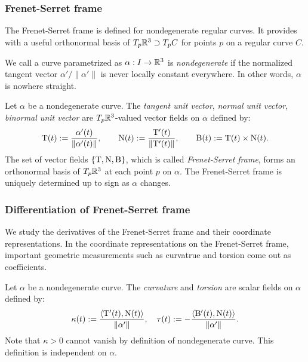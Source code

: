 \documentclass{../exp}
\def\a{\alpha}
\begin{document}
\subsubsection{Frenet-Serret frame}
The Frenet-Serret frame is defined for nondegenerate regular curves.
It provides with a useful orthonormal basis of $T_p\mathbb{R}^3\supset T_pC$ for points $p$ on a regular curve $C$.
\begin{defn}
We call a curve parametrized as $\a:I\to\R^3$ is \emph{nondegenerate} if the normalized tangent vector $\a'/\|\a'\|$ is never locally constant everywhere.
In other words, $\a$ is nowhere straight.
\end{defn}

\begin{defn}
Let $\a$ be a nondegenerate curve.
The \emph{tangent unit vector}, \emph{normal unit vector}, \emph{binormal unit vector} are $T_p\mathbb{R}^3$-valued vector fields on $\a$ defined by:
\[\rT(t):=\frac{\a'(t)}{\|\a'(t)\|},\qquad\rN(t):=\frac{\rT'(t)}{\|\rT'(t)\|},\qquad\rB(t):=\rT(t)\times\rN(t).\]
The set of vector fields $\{\mathrm{T},\mathrm{N},\mathrm{B}\}$, which is called \emph{Frenet-Serret frame}, forms an orthonormal basis of $T_p\mathbb{R}^3$ at each point $p$ on $\a$.
The Frenet-Serret frame is uniquely determined up to sign as $\a$ changes.
\end{defn}



\subsubsection{Differentiation of Frenet-Serret frame}

We study the derivatives of the Frenet-Serret frame and their coordinate representations.
In the coordinate representations on the Frenet-Serret frame, important geometric measurements such as curvatrue and torsion come out as coefficients.

\begin{defn}
Let $\a$ be a nondegenerate curve.
The \emph{curvature} and \emph{torsion} are scalar fields on $\a$ defined by:
\[\kappa(t):=\frac{\<\rT'(t),\rN(t)\>}{\|\a'\|},\quad\tau(t):=-\frac{\<\rB'(t),\rN(t)\>}{\|\a'\|}.\]
Note that $\kappa>0$ cannot vanish by definition of nondegenerate curve.
This definition is independent on $\a$.
\end{defn}
\end{document}
